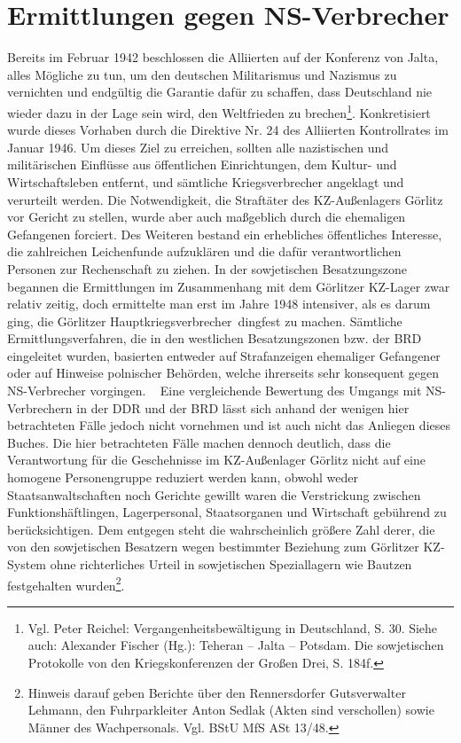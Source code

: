 \documentclass[a4paper,12pt,ngerman,
]{nisebook}
\begin{document}
\section{Ermittlungen gegen NS-Verbrecher\label{ns-verbrechen}}
Bereits im Februar 1942 beschlossen die Alliierten auf der Konferenz von Jalta, alles Mögliche zu tun, um \glqq den deutschen Militarismus und Nazismus zu vernichten und endgültig die Garantie dafür zu schaffen, dass Deutschland nie wieder dazu in der Lage sein wird, den Weltfrieden zu brechen\grqq\footnote{Vgl. Peter Reichel: Vergangenheitsbewältigung in Deutschland, S. 30. Siehe auch: Alexander Fischer (Hg.): Teheran -- Jalta -- Potsdam. Die sowjetischen Protokolle von den Kriegskonferenzen der Großen Drei, S. 184f.}. Konkretisiert wurde dieses Vorhaben durch die Direktive Nr. 24 des Alliierten Kontrollrates im Januar 1946.
Um dieses Ziel zu erreichen, sollten alle nazistischen und militärischen Einflüsse aus öffentlichen Einrichtungen, dem Kultur- und Wirtschaftsleben entfernt, und sämtliche Kriegsverbrecher angeklagt und verurteilt werden.
Die Notwendigkeit, die Straftäter des KZ-Außenlagers Görlitz vor Gericht zu stellen, wurde aber auch maßgeblich durch die ehemaligen Gefangenen forciert. Des Weiteren bestand ein erhebliches öffentliches Interesse, die zahlreichen Leichenfunde aufzuklären und die dafür verantwortlichen Personen zur Rechenschaft zu ziehen. 
In der sowjetischen Besatzungszone begannen die Ermittlungen im Zusammenhang mit dem Görlitzer KZ-Lager zwar relativ zeitig, doch ermittelte man erst im Jahre 1948 intensiver, als es darum ging, die Görlitzer \glqq Hauptkriegsverbrecher\grqq~dingfest zu machen. 
Sämtliche Ermittlungsverfahren, die in den westlichen Besatzungszonen bzw. der BRD eingeleitet wurden, basierten entweder auf Strafanzeigen ehemaliger Gefangener oder auf Hinweise polnischer Behörden, welche ihrerseits sehr konsequent gegen NS-Verbrecher vorgingen.
~\newline
Eine vergleichende Bewertung des Umgangs mit NS-Verbrechern in der DDR und der BRD lässt sich anhand der wenigen hier betrachteten Fälle jedoch nicht vornehmen und ist auch nicht das Anliegen dieses Buches. Die hier betrachteten Fälle machen dennoch deutlich, dass die Verantwortung für die Geschehnisse im KZ-Außenlager Görlitz nicht auf eine homogene Personengruppe reduziert werden kann, obwohl weder Staatsanwaltschaften noch Gerichte gewillt waren die Verstrickung zwischen Funktionshäftlingen, Lagerpersonal, Staatsorganen und Wirtschaft gebührend zu berücksichtigen. Dem entgegen steht die wahrscheinlich größere Zahl derer, die von den sowjetischen Besatzern wegen bestimmter Beziehung zum Görlitzer KZ-System ohne richterliches Urteil in sowjetischen Speziallagern wie Bautzen festgehalten wurden\footnote{Hinweis darauf geben Berichte über den Rennersdorfer Gutsverwalter Lehmann, den Fuhrparkleiter Anton Sedlak (Akten sind verschollen) sowie Männer des Wachpersonals. Vgl. BStU MfS ASt 13/48.}. 
\end{document}
